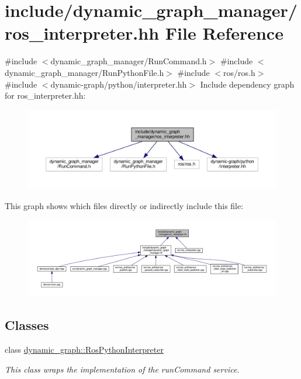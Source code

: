 \hypertarget{ros__interpreter_8hh}{}\section{include/dynamic\+\_\+graph\+\_\+manager/ros\+\_\+interpreter.hh File Reference}
\label{ros__interpreter_8hh}
{\ttfamily \#include $<$dynamic\+\_\+graph\+\_\+manager/\+Run\+Command.\+h$>$}\newline
{\ttfamily \#include $<$dynamic\+\_\+graph\+\_\+manager/\+Run\+Python\+File.\+h$>$}\newline
{\ttfamily \#include $<$ros/ros.\+h$>$}\newline
{\ttfamily \#include $<$dynamic-\/graph/python/interpreter.\+hh$>$}\newline
Include dependency graph for ros\+\_\+interpreter.\+hh\+:
\nopagebreak
\begin{figure}[H]
\begin{center}
\leavevmode
\includegraphics[width=350pt]{ros__interpreter_8hh__incl}
\end{center}
\end{figure}
This graph shows which files directly or indirectly include this file\+:
\nopagebreak
\begin{figure}[H]
\begin{center}
\leavevmode
\includegraphics[width=350pt]{ros__interpreter_8hh__dep__incl}
\end{center}
\end{figure}
\subsection*{Classes}
\begin{DoxyCompactItemize}
\item 
class \hyperlink{classdynamic__graph_1_1RosPythonInterpreter}{dynamic\+\_\+graph\+::\+Ros\+Python\+Interpreter}
\begin{DoxyCompactList}\small\item\em This class wraps the implementation of the run\+Command service. \end{DoxyCompactList}\end{DoxyCompactItemize}
